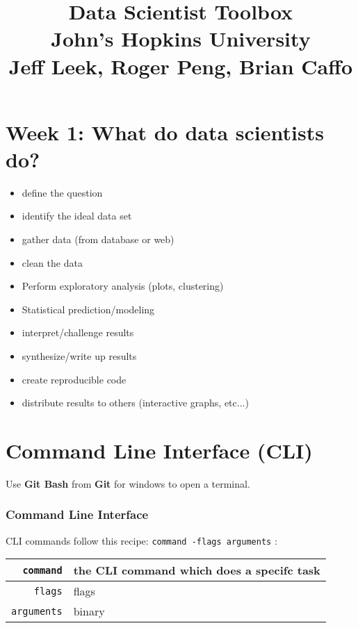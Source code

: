 \documentclass[a4paper,12pt]{report}
\newcommand{\code}[1]{\texttt{#1} }
\begin{document}
\tableofcontents

\title{Data Scientist Toolbox \\
John's Hopkins University \\
Jeff Leek, Roger Peng, Brian Caffo}
\maketitle
\part{Week 1: What do data scientists do?}
\begin{itemize}
\item define the question
\item identify the ideal data set
\item gather data (from database or web)
\item clean the data
\item Perform exploratory analysis (plots, clustering)
\item Statistical prediction/modeling
\item interpret/challenge results
\item synthesize/write up results
\item create reproducible code
\item distribute results to others (interactive graphs, etc...)
\end{itemize}

\part{Command Line Interface (CLI)}
Use \textbf{Git Bash} from \textbf{Git} for windows to open a terminal.
\section{Command Line Interface}
CLI commands follow this recipe: \code{\textcolor[rgb]{0,0,1}{command} \textcolor[rgb]{1,0,0}{-flags} arguments}:
\begin{table}[H]
\centering
\begin{tabular}{|r|l|}
  \hline
  \code{command} & the CLI command which does a specifc task \\
	\hline
  \code{flags} & flags \\
	\hline
  \code{arguments} & binary \\

	\hline
\end{tabular}
\end{table}
\end{document}
